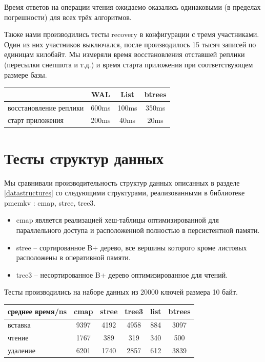 \documentclass[pdftex,ptm,12pt,a4paper]{report}
\theoremstyle{definition}
\begin{document}
Время ответов на операции чтения ожидаемо оказались одинаковыми (в пределах погрешности) для всех трёх алгоритмов.

Также нами производились тесты recovery в конфигурации с тремя участниками.
Один из них участников выключался, после производилось 15 тысяч записей по единицам килобайт.
Мы измеряли время восстановления отставшей реплики (пересылки снепшота и т.д.) и время старта приложения при соответствующем размере базы.

\begin{center}
\begin{tabular} {|l |c c c|}
\hline
 & WAL & List & btrees \\
\hline
восстановление реплики & 600ms & 100ms & 350ms \\
старт приложения & 200ms & 40ms & 20ms \\
\hline
\end{tabular}
\end{center}


\section{Тесты структур данных}
\label{pmemkvtests}

Мы сравнивали производительность структур данных описанных в разделе \ref{datastructures} со следующими структурами, реализованными в
библиотеке pmemkv \cite{pmemkv}: cmap, stree, tree3.

\begin{itemize}
\item cmap является реализацией хеш-таблицы оптимизированной для параллельного доступа \cite{malakhov2015perbucket} и расположенной полностью в персистентной памяти.
\item stree -- сортированное B+ дерево, все вершины которого кроме листовых расположены в оперативной памяти.
\item tree3 -- несортированное B+ дерево оптимизированное для чтений.
\end{itemize}

Тесты производились на наборе данных из 20000 ключей размера 10 байт.

\begin{center}
\begin{tabular} {|l| c c c c c|}
\hline
среднее время/ns & cmap & stree & tree3 & list & btrees \\
\hline
вставка & 9397 & 4192 & 4958 & 884 & 3097 \\
чтение & 1767 & 389 & 319 & 340 & 500 \\
удаление & 6201 & 1740 & 2857 & 612 & 3839 \\
\hline
\end{tabular}
\end{center}
\end{document}
